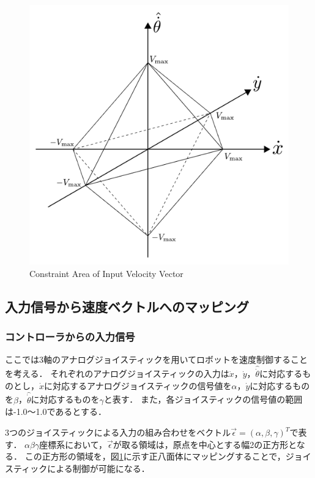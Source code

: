 \documentclass[../master]{subfiles}
\begin{document}
  \begin{figure}[h]
    \centering
    \includegraphics[width=80truemm, clip]{images/constraint.pdf}
    \caption{Constraint Area of Input Velocity Vector}
    \label{fig:constraint}
  \end{figure}

  \subsection{入力信号から速度ベクトルへのマッピング}

  \subsubsection{コントローラからの入力信号}

  ここでは3軸のアナログジョイスティックを用いてロボットを速度制御することを考える．
  それぞれのアナログジョイスティックの入力は$\dot{x}$，$\dot{y}$，$\hat{\dot{\theta}}$に対応するものとし，$\dot{x}$に対応するアナログジョイスティックの信号値を$\alpha$，$\dot{y}$に対応するものを$\beta$，$\hat{\dot{\theta}}$に対応するものを$\gamma$と表す．
  また，各ジョイスティックの信号値の範囲は-1.0～1.0であるとする．

  3つのジョイスティックによる入力の組み合わせをベクトル$\vec{\epsilon} = (\alpha, \beta, \gamma)^T$で表す．
  $\alpha\beta\gamma$座標系において，$\vec{\epsilon}$が取る領域は，原点を中心とする幅2の正方形となる．
  この正方形の領域を，図\ref{fig:constraint}に示す正八面体にマッピングすることで，ジョイスティックによる制御が可能になる．
\end{document}
